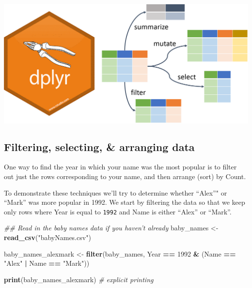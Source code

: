 \documentclass[]{book}
\newenvironment{Shaded}{\begin{snugshade}}{\end{snugshade}}
\newcommand{\CommentTok}[1]{\textcolor[rgb]{0.56,0.35,0.01}{\textit{#1}}}
\newcommand{\DecValTok}[1]{\textcolor[rgb]{0.00,0.00,0.81}{#1}}
\newcommand{\KeywordTok}[1]{\textcolor[rgb]{0.13,0.29,0.53}{\textbf{#1}}}
\newcommand{\NormalTok}[1]{#1}
\newcommand{\OperatorTok}[1]{\textcolor[rgb]{0.81,0.36,0.00}{\textbf{#1}}}
\newcommand{\StringTok}[1]{\textcolor[rgb]{0.31,0.60,0.02}{#1}}
\begin{document}
\includegraphics{R/Rintro/images/dplyr.png}

\hypertarget{filtering-selecting-arranging-data}{%
\subsection{Filtering, selecting, \& arranging data}\label{filtering-selecting-arranging-data}}

One way to find the year in which your name was the most popular
is to filter out just the rows corresponding to your name, and
then arrange (sort) by Count.

To demonstrate these techniques we'll try to determine whether
``Alex''" or ``Mark'' was more popular in 1992. We start by filtering the
data so that we keep only rows where Year is equal to \texttt{1992} and Name is
either ``Alex'' or ``Mark''.

\begin{Shaded}
\begin{Highlighting}[]
\CommentTok{## Read in the baby names data if you haven't already}
\NormalTok{baby_names <-}\StringTok{ }\KeywordTok{read_csv}\NormalTok{(}\StringTok{"babyNames.csv"}\NormalTok{)}
\end{Highlighting}
\end{Shaded}

\begin{Shaded}
\begin{Highlighting}[]
\NormalTok{baby_names_alexmark <-}\StringTok{ }\KeywordTok{filter}\NormalTok{(baby_names, }
\NormalTok{             Year }\OperatorTok{==}\StringTok{ }\DecValTok{1992} \OperatorTok{&}\StringTok{ }\NormalTok{(Name }\OperatorTok{==}\StringTok{ "Alex"} \OperatorTok{|}\StringTok{ }\NormalTok{Name }\OperatorTok{==}\StringTok{ "Mark"}\NormalTok{))}

\KeywordTok{print}\NormalTok{(baby_names_alexmark) }\CommentTok{# explicit printing             }
\end{Highlighting}
\end{Shaded}
\end{document}
